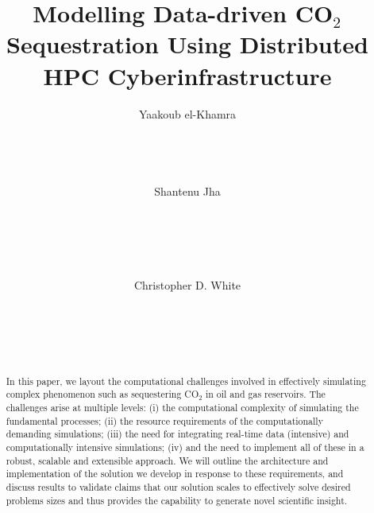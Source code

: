 \documentclass{acm_proc_article-sp}
\begin{document}
\title{Modelling Data-driven CO$_{2}$ Sequestration Using Distributed HPC Cyberinfrastructure}



\author{
\alignauthor
Yaakoub el-Khamra\\
       \\
       \\
       \\
       \\
\alignauthor
Shantenu Jha\\
       \\
       \\
       \\
       \\
       \\
\alignauthor
Christopher D. White\\
       \\
       \\
       \\
       \\
}

\maketitle

\begin{abstract} In this paper, we layout the
  computational challenges involved in effectively simulating complex
  phenomenon such as sequestering CO$_2$ in  oil and gas
  reservoirs. The challenges arise at multiple levels: (i) the
  computational complexity of simulating the fundamental processes;
  (ii) the resource requirements of the computationally demanding
  simulations; (iii) the need for integrating real-time data
  (intensive) and computationally intensive simulations; (iv) and the
  need to implement all of these in a robust, scalable and extensible
  approach. We will outline the architecture and implementation of the
  solution we develop in response to these requirements, and discuss
  results to validate claims that our solution scales to effectively
  solve desired problems sizes and thus provides the capability to
  generate novel scientific insight.\end{abstract}
\end{document}
